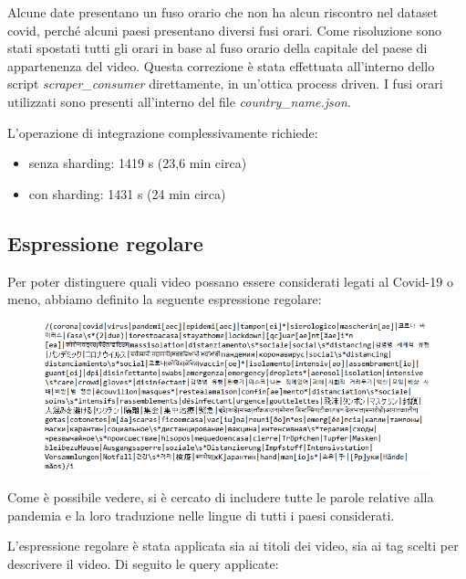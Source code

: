 \documentclass[10pt, a4paper,openany]{article}
\begin{document}
	Alcune date presentano un fuso orario che non ha alcun riscontro nel dataset covid, perché alcuni paesi presentano diversi fusi orari. Come risoluzione sono stati spostati tutti gli orari in base al fuso orario della capitale del paese di appartenenza del video. Questa correzione è stata effettuata all'interno dello script \textit{scraper\_consumer} direttamente, in un'ottica process driven. I fusi orari utilizzati sono presenti all'interno del file \textit{country\_name.json}.

	L'operazione di integrazione complessivamente richiede:
	\begin{itemize}
		\item senza sharding: 1419 s (23,6 min circa)
		\item con sharding: 1431 s (24 min circa)
	\end{itemize}

\subsection*{Espressione regolare}
	Per poter distinguere quali video possano essere considerati legati al Covid-19 o meno, abbiamo definito la seguente espressione regolare:
	\begin{figure}[H]
		\centering
		\includegraphics[width=0.95\linewidth]{pics/er.png}
	\end{figure}

	Come è possibile vedere, si è cercato di includere tutte le parole relative alla pandemia e la loro traduzione nelle lingue di tutti i paesi considerati.
	
	L'espressione regolare è stata applicata sia ai titoli dei video, sia ai tag scelti per descrivere il video. Di seguito le query applicate:
	
\end{document}

